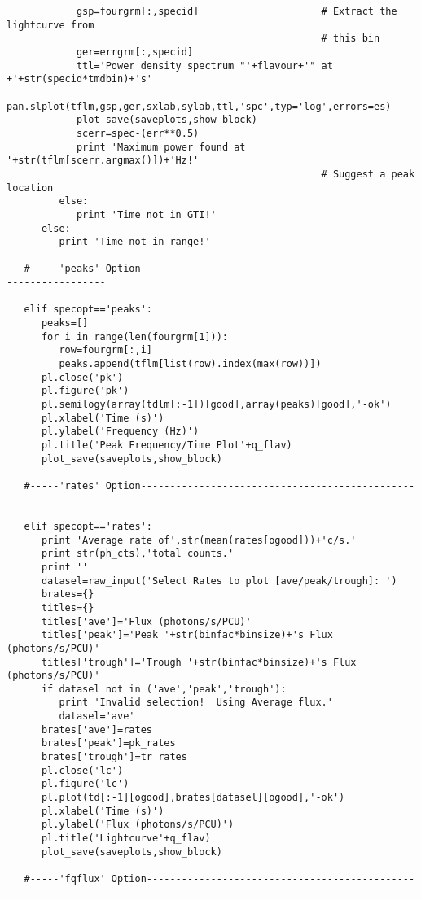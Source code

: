 \begin{verbatim}
            gsp=fourgrm[:,specid]                     # Extract the lightcurve from
                                                      # this bin
            ger=errgrm[:,specid]
            ttl='Power density spectrum "'+flavour+'" at +'+str(specid*tmdbin)+'s'
            pan.slplot(tflm,gsp,ger,sxlab,sylab,ttl,'spc',typ='log',errors=es)
            plot_save(saveplots,show_block)
            scerr=spec-(err**0.5)
            print 'Maximum power found at '+str(tflm[scerr.argmax()])+'Hz!'
                                                      # Suggest a peak location
         else:
            print 'Time not in GTI!'
      else:
         print 'Time not in range!'

   #-----'peaks' Option----------------------------------------------------------------

   elif specopt=='peaks':
      peaks=[]
      for i in range(len(fourgrm[1])):
         row=fourgrm[:,i]
         peaks.append(tflm[list(row).index(max(row))])
      pl.close('pk')
      pl.figure('pk')
      pl.semilogy(array(tdlm[:-1])[good],array(peaks)[good],'-ok')
      pl.xlabel('Time (s)')
      pl.ylabel('Frequency (Hz)')
      pl.title('Peak Frequency/Time Plot'+q_flav)
      plot_save(saveplots,show_block)

   #-----'rates' Option----------------------------------------------------------------

   elif specopt=='rates':
      print 'Average rate of',str(mean(rates[ogood]))+'c/s.'
      print str(ph_cts),'total counts.'
      print ''
      datasel=raw_input('Select Rates to plot [ave/peak/trough]: ')
      brates={}
      titles={}
      titles['ave']='Flux (photons/s/PCU)'
      titles['peak']='Peak '+str(binfac*binsize)+'s Flux (photons/s/PCU)'
      titles['trough']='Trough '+str(binfac*binsize)+'s Flux (photons/s/PCU)'
      if datasel not in ('ave','peak','trough'):
         print 'Invalid selection!  Using Average flux.'
         datasel='ave'
      brates['ave']=rates
      brates['peak']=pk_rates
      brates['trough']=tr_rates
      pl.close('lc')
      pl.figure('lc')
      pl.plot(td[:-1][ogood],brates[datasel][ogood],'-ok')
      pl.xlabel('Time (s)')
      pl.ylabel('Flux (photons/s/PCU)')
      pl.title('Lightcurve'+q_flav)
      plot_save(saveplots,show_block)

   #-----'fqflux' Option---------------------------------------------------------------


\end{verbatim}
